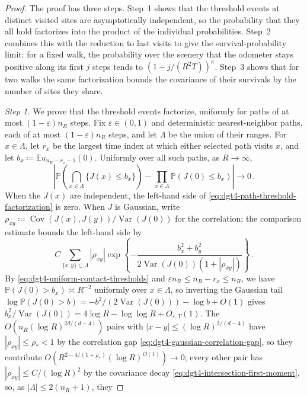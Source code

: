 \documentclass[11pt]{amsart}
\theoremstyle{plain}
\theoremstyle{definition}
\newcommand{\E}{\mathbb{E}}
\renewcommand{\P}{\mathbb{P}}
\DeclareMathOperator{\Var}{Var}
\DeclareMathOperator{\Cov}{Cov}
\begin{document}
\begin{proof}
	The proof has three steps. Step~1 shows that the threshold events at distinct visited
	sites are asymptotically independent, so the probability that they all hold factorizes into
	the product of the individual probabilities. Step~2 combines this with the reduction to
	last visits to give the survival-probability limit: for a fixed walk, the probability over the
	scenery that the odometer stays positive along its first $j$ steps tends to $(1-j/(R^2T))^\kappa$. Step~3 shows that
	for two walks the same factorization bounds the covariance of their survivals by the number
	of sites they share.
	\par\smallskip\noindent\emph{Step 1.} We prove that the threshold events factorize,
	uniformly for paths of at most $(1-\varepsilon)n_R$ steps.
	Fix $\varepsilon\in(0,1)$ and deterministic
	nearest-neighbor paths, each of at most
	$(1-\varepsilon)n_R$ steps, and let $\Lambda$ be the union of their ranges. For $x\in\Lambda$,
	let $r_x$ be the largest time index at which either selected path visits $x$, and
	let $b_x\coloneqq\E u_{n_R-r_x-1}(0)$. Uniformly over all such paths, as $R\to\infty$,
	\begin{equation}\label{eq:dgt4-path-threshold-factorization}
		\left|
		\P\left(\bigcap_{x\in\Lambda}\{J(x)\leq b_x\}\right)
		-\prod_{x\in\Lambda}\P(J(0)\leq b_x)
		\right|
		\longrightarrow0\, .
	\end{equation}
	When the $J(x)$ are independent, the left-hand side of
	\eqref{eq:dgt4-path-threshold-factorization} is zero. When $J$ is Gaussian, write
	$\rho_{xy}\coloneqq\Cov(J(x),J(y))/\Var(J(0))$ for the correlation; the comparison estimate
	\citep[Corollary~2.1, p.~496]{LiShao} bounds the left-hand side by
	\[
		C\sum_{\{x,y\}\subset\Lambda}|\rho_{xy}|
		\exp\left\{-\frac{b_x^2+b_y^2}{2\Var(J(0))(1+|\rho_{xy}|)}\right\}\, .
	\]
	By \eqref{eq:dgt4-uniform-contact-thresholds} and $\varepsilon n_R\leq n_R-r_x\leq n_R$, we have
	$\P(J(0)>b_x)\asymp R^{-2}$ uniformly over $x\in\Lambda$, so inverting the Gaussian tail
	$\log\P(J(0)>b)=-b^2/(2\Var(J(0)))-\log b+O(1)$ gives
	$b_x^2/\Var(J(0))=4\log R-\log\log R+O_{\varepsilon,T}(1)$. The
	$O(n_R(\log R)^{2d/(d-4)})$ pairs with $|x-y|\leq(\log R)^{2/(d-4)}$ have $|\rho_{xy}|\leq\rho_*<1$ by the
	correlation gap \eqref{eq:dgt4-gaussian-correlation-gap}, so they contribute
	$O(R^{2-4/(1+\rho_*)}(\log R)^{O(1)})\to0$; every other pair has $|\rho_{xy}|\leq C/(\log R)^2$ by the
	covariance decay \eqref{eq:dgt4-intersection-first-moment}, so, as $|\Lambda|\leq2(n_R+1)$, they

\end{proof}
\end{document}
